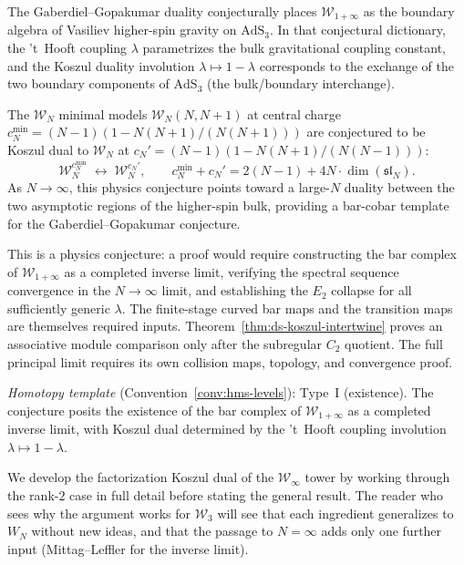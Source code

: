 \begin{remark}
\label{rem:w-infty-holography}
The Gaberdiel--Gopakumar duality \cite{GG11} conjecturally places
$\mathcal{W}_{1+\infty}$ as the boundary algebra of Vasiliev
higher-spin gravity on $\mathrm{AdS}_3$.  In that conjectural
dictionary, the 't~Hooft coupling $\lambda$ parametrizes the bulk
gravitational coupling constant, and the Koszul duality involution
$\lambda \mapsto 1 - \lambda$ corresponds to
the exchange of the two boundary components of $\mathrm{AdS}_3$
(the bulk/boundary interchange).

The $\mathcal{W}_N$ minimal models $\mathcal{W}_N(N, N{+}1)$ at
central charge $c_N^{\min} = (N-1)(1 - N(N+1)/(N(N+1)))$ are
conjectured to be Koszul dual to $\mathcal{W}_N$ at
$c_N' = (N-1)(1 - N(N+1)/(N(N-1)))$:
\[
\mathcal{W}_N^{c_N^{\min}} \;\longleftrightarrow\;
\mathcal{W}_N^{c_N'},
\qquad c_N^{\min} + c_N' = 2(N-1) + 4N \cdot \dim(\mathfrak{sl}_N).
\]
As $N \to \infty$, this physics conjecture points toward a large-$N$
duality between the
two asymptotic regions of the higher-spin bulk, providing a
bar-cobar template for the Gaberdiel--Gopakumar conjecture.

This is a physics conjecture: a proof would require constructing
the bar complex of $\mathcal{W}_{1+\infty}$ as a completed
inverse limit, verifying the spectral sequence convergence in the
$N \to \infty$ limit, and establishing the $E_2$ collapse for
all sufficiently generic $\lambda$.  The finite-stage curved bar maps and the transition maps are themselves required inputs.
Theorem~\ref{thm:ds-koszul-intertwine} proves an associative module comparison only after the subregular $C_2$ quotient.
The full principal limit requires its own collision maps, topology, and convergence proof.

\emph{Homotopy template} (Convention~\ref{conv:hms-levels}): Type~I (existence).
The conjecture posits the existence of the bar complex of $\mathcal{W}_{1+\infty}$ as a completed inverse limit, with Koszul dual determined by the 't~Hooft coupling involution $\lambda \mapsto 1 - \lambda$.
\end{remark}


We develop the factorization Koszul dual of the $\mathcal{W}_\infty$
tower by working through the rank-$2$ case in full detail before
stating the general result.  The reader who sees why the argument works
for $\mathcal{W}_3$ will see that each ingredient generalizes to
$W_N$ without new ideas, and that the passage to $N = \infty$
adds only one further input (Mittag--Leffler for the inverse limit).

